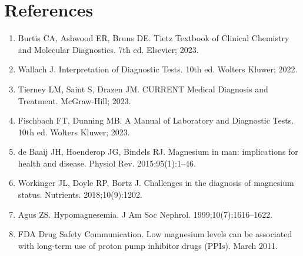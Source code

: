 \section*{References}
\begin{enumerate}
  \item Burtis CA, Ashwood ER, Bruns DE. Tietz Textbook of Clinical Chemistry and Molecular Diagnostics. 7th ed. Elsevier; 2023.
  \item Wallach J. Interpretation of Diagnostic Tests. 10th ed. Wolters Kluwer; 2022.
  \item Tierney LM, Saint S, Drazen JM. CURRENT Medical Diagnosis and Treatment. McGraw-Hill; 2023.
  \item Fischbach FT, Dunning MB. A Manual of Laboratory and Diagnostic Tests. 10th ed. Wolters Kluwer; 2023.
  \item de Baaij JH, Hoenderop JG, Bindels RJ. Magnesium in man: implications for health and disease. Physiol Rev. 2015;95(1):1--46.
  \item Workinger JL, Doyle RP, Bortz J. Challenges in the diagnosis of magnesium status. Nutrients. 2018;10(9):1202.
  \item Agus ZS. Hypomagnesemia. J Am Soc Nephrol. 1999;10(7):1616--1622.
  \item FDA Drug Safety Communication. Low magnesium levels can be associated with long-term use of proton pump inhibitor drugs (PPIs). March 2011.
\end{enumerate}

\clearpage
